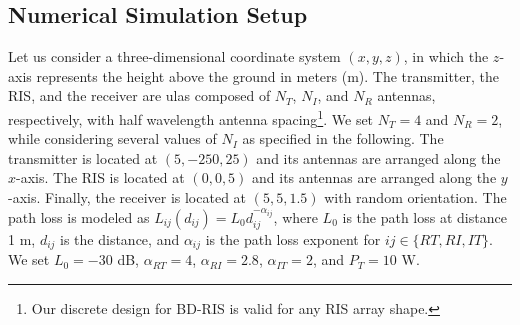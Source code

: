 \documentclass[twocolumn,10pt]{IEEEtran}
\begin{document}
\subsection{Numerical Simulation Setup}

Let us consider a three-dimensional coordinate system $(x,y,z)$, in which the $z$-axis represents the height above the ground in meters (m).
The transmitter, the RIS, and the receiver are \glspl{ula} composed of $N_{T}$, $N_{I}$, and $N_{R}$ antennas, respectively, with half wavelength antenna spacing\footnote{Our discrete design for BD-RIS is valid for any RIS array shape.}.
We set $N_{T}=4$ and $N_{R}=2$, while considering several values of $N_{I}$ as specified in the following.
The transmitter is located at $(5,-250,25)$ and its antennas are arranged along the $x$-axis.
The RIS is located at $(0,0,5)$ and its antennas are arranged along the $y$-axis.
Finally, the receiver is located at $(5,5,1.5)$ with random orientation.
The path loss is modeled as $L_{ij}(d_{ij})=L_{0}d_{ij}^{-\alpha_{ij}}$, where $L_{0}$ is the path loss at distance 1 m, $d_{ij}$ is the distance, and $\alpha_{ij}$ is the path loss exponent for $ij\in\{RT,RI,IT\}$.
We set $L_{0}=-30$ dB, $\alpha_{RT}=4$, $\alpha_{RI}=2.8$, $\alpha_{IT}=2$, and $P_{T}=10$ W. 
\end{document}
